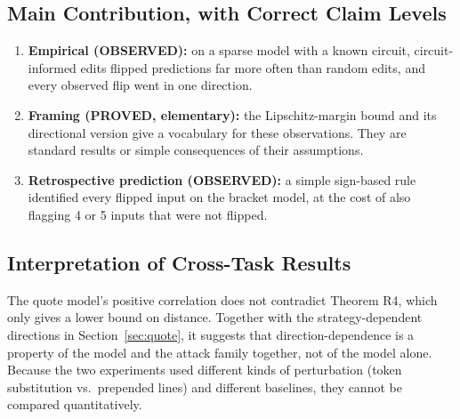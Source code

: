 \documentclass[11pt]{article}
\newcommand{\lab}[1]{{\footnotesize\MakeUppercase{#1}}}
\newcommand{\proved}{\lab{proved}}
\newcommand{\observed}{\lab{observed}}
\begin{document}
\subsection{Main Contribution, with Correct Claim Levels}
\begin{enumerate}
  \item \textbf{Empirical (\observed):} on a sparse model with a known circuit, circuit-informed edits flipped predictions far more often than random edits, and every observed flip went in one direction.
  \item \textbf{Framing (\proved, elementary):} the Lipschitz-margin bound and its directional version give a vocabulary for these observations. They are standard results or simple consequences of their assumptions.
  \item \textbf{Retrospective prediction (\observed):} a simple sign-based rule identified every flipped input on the bracket model, at the cost of also flagging 4 or 5 inputs that were not flipped.
\end{enumerate}

\subsection{Interpretation of Cross-Task Results}
The quote model's positive correlation does not contradict Theorem R4, which only gives a lower bound on distance. Together with the strategy-dependent directions in Section~\ref{sec:quote}, it suggests that direction-dependence is a property of the model and the attack family together, not of the model alone. Because the two experiments used different kinds of perturbation (token substitution vs.\ prepended lines) and different baselines, they cannot be compared quantitatively.
\end{document}
